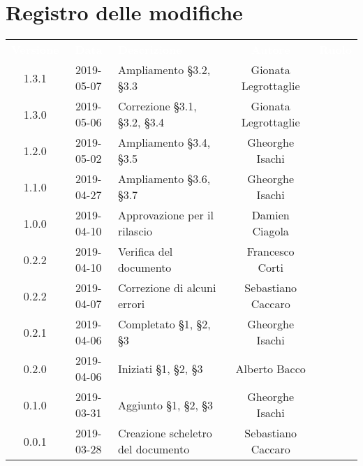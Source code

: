 \section*{Registro delle modifiche}
{
	\renewcommand{\arraystretch}{1.5}
	\centering
	\begin{longtable}{ c c C{6cm} c c }
		\textcolor{white}{\textbf{Versione}} & \textcolor{white}{\textbf{Data}} & \textcolor{white}{\textbf{Descrizione}} & \textcolor{white}{\textbf{Autore}} & \textcolor{white}{\textbf{Ruolo}}\\

		1.3.1 & 2019-05-07 & Ampliamento \S3.2, \S3.3 & Gionata Legrottaglie & \reda{} \\
		
		1.3.0 & 2019-05-06 & Correzione \S3.1, \S3.2, \S3.4 & Gionata Legrottaglie & \reda{} \\
				
		1.2.0 & 2019-05-02 & Ampliamento \S3.4, \S3.5 & Gheorghe Isachi & \reda{} \\		
		
		1.1.0 & 2019-04-27 & Ampliamento \S3.6, \S3.7 & Gheorghe Isachi & \reda{} \\
		
		1.0.0 & 2019-04-10 & Approvazione per il rilascio & Damien Ciagola & \RdP{} \\ 
			
		0.2.2 & 2019-04-10 & Verifica del documento & Francesco Corti & \ver{} \\ 
		
		0.2.2 & 2019-04-07 & Correzione di alcuni errori & Sebastiano Caccaro & \reda{} \\ 

		0.2.1 & 2019-04-06 & Completato \S1, \S2, \S3 & Gheorghe Isachi & \reda{} \\
		
		0.2.0 & 2019-04-06 & Iniziati \S1, \S2, \S3 & Alberto Bacco & \reda{} \\
		
		0.1.0 & 2019-03-31 & Aggiunto \S1, \S2, \S3 & Gheorghe Isachi & \reda{} \\
		
		0.0.1 & 2019-03-28 & Creazione scheletro del documento & Sebastiano Caccaro & \reda{}
		
	\end{longtable}

}